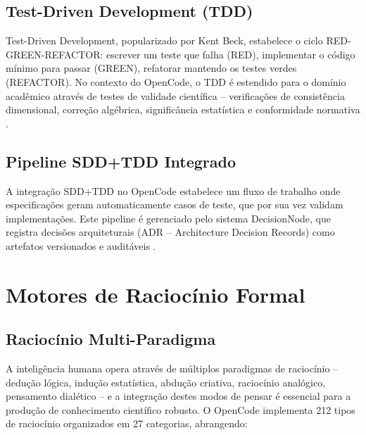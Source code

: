 \documentclass[12pt,a4paper,sumario=tradicional]{abntex2}
\begin{document}
\subsection{Test-Driven Development (TDD)}

Test-Driven Development, popularizado por Kent Beck, estabelece o ciclo RED-GREEN-REFACTOR: escrever um teste que falha (RED), implementar o código mínimo para passar (GREEN), refatorar mantendo os testes verdes (REFACTOR). No contexto do OpenCode, o TDD é estendido para o domínio acadêmico através de testes de validade científica -- verificações de consistência dimensional, correção algébrica, significância estatística e conformidade normativa \cite{gomes2025sdscai}.

\subsection{Pipeline SDD+TDD Integrado}

A integração SDD+TDD no OpenCode estabelece um fluxo de trabalho onde especificações geram automaticamente casos de teste, que por sua vez validam implementações. Este pipeline é gerenciado pelo sistema DecisionNode, que registra decisões arquiteturais (ADR -- Architecture Decision Records) como artefatos versionados e auditáveis \cite{kruchten2009documentation}.

\section{Motores de Raciocínio Formal}

\subsection{Raciocínio Multi-Paradigma}

A inteligência humana opera através de múltiplos paradigmas de raciocínio -- dedução lógica, indução estatística, abdução criativa, raciocínio analógico, pensamento dialético -- e a integração destes modos de pensar é essencial para a produção de conhecimento científico robusto. O OpenCode implementa 212 tipos de raciocínio organizados em 27 categorias, abrangendo:
\end{document}
